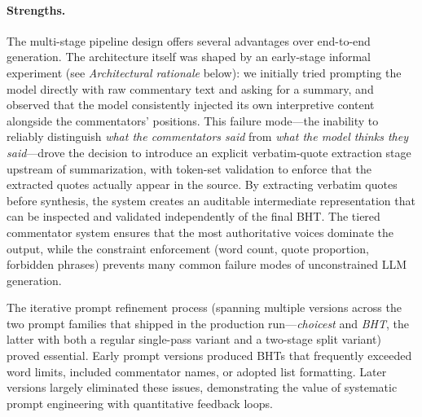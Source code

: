 \paragraph{Strengths.}
The multi-stage pipeline design offers several advantages over end-to-end generation. The architecture itself was shaped by an early-stage informal experiment (see \textit{Architectural rationale} below): we initially tried prompting the model directly with raw commentary text and asking for a summary, and observed that the model consistently injected its own interpretive content alongside the commentators' positions. This failure mode---the inability to reliably distinguish \textit{what the commentators said} from \textit{what the model thinks they said}---drove the decision to introduce an explicit verbatim-quote extraction stage upstream of summarization, with token-set validation to enforce that the extracted quotes actually appear in the source. By extracting verbatim quotes before synthesis, the system creates an auditable intermediate representation that can be inspected and validated independently of the final BHT. The tiered commentator system ensures that the most authoritative voices dominate the output, while the constraint enforcement (word count, quote proportion, forbidden phrases) prevents many common failure modes of unconstrained LLM generation.

The iterative prompt refinement process (spanning multiple versions across the two prompt families that shipped in the production run---\emph{choicest} and \emph{BHT}, the latter with both a regular single-pass variant and a two-stage split variant) proved essential. Early prompt versions produced BHTs that frequently exceeded word limits, included commentator names, or adopted list formatting. Later versions largely eliminated these issues, demonstrating the value of systematic prompt engineering with quantitative feedback loops.

